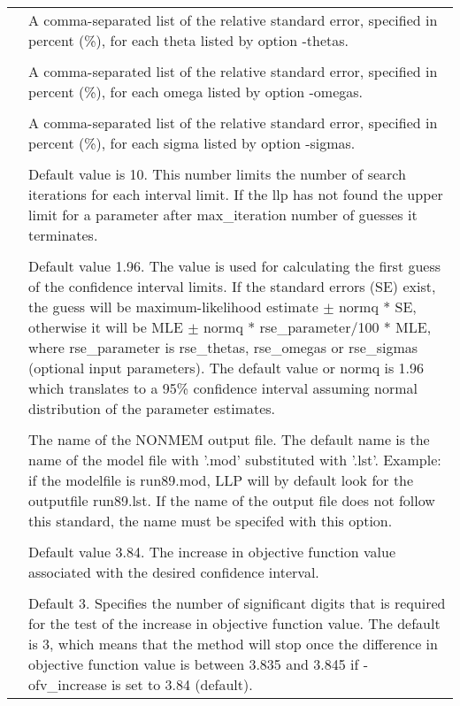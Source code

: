 \documentclass[a4paper,12pt]{article}
\begin{document}
\begin{longtable}{p{1in}p{4in}}
\verb%-rse_thetas=<list>% & \\
 & A comma-separated list of the relative standard error, specified in percent (\%), for each theta listed by option -thetas. \\
\\
\verb%-rse_omegas=<list>% & \\
 & A comma-separated list of the relative standard error, specified in percent (\%), for each omega listed by option -omegas. \\
\\
\verb%-rse_sigmas=<list>% & \\
 & A comma-separated list of the relative standard error, specified in percent (\%), for each sigma listed by option -sigmas. \\
\\
\verb%-max_iterations=N% & \\
 & Default value is 10. This number limits the number of search iterations for each interval limit. If the llp has not found the upper limit for a parameter after max\_iteration number of guesses it terminates. \\
\\
\verb%-normq=X% & \\
\nopagebreak
 & Default value 1.96. The value is used for calculating the first guess of the confidence interval limits. If the standard errors (SE) exist, the guess will be maximum-likelihood estimate $\pm$ normq * SE, otherwise it will be MLE $\pm$ normq * rse\_parameter/100 * MLE, where rse\_parameter is rse\_thetas, rse\_omegas or rse\_sigmas (optional input parameters). The default value or normq is 1.96 which translates to a 95\% confidence interval assuming normal distribution of the parameter estimates. \\
\\
\verb%-outputfile=<filename>% & \\
 & The name of the NONMEM output file. The default name is the name of the model file with '.mod' substituted with '.lst'. Example: if the modelfile is run89.mod, LLP will by default look for the outputfile run89.lst. If the name of the output file does not follow this standard, the name must be specifed with this option. \\
\\
\verb%-ofv_increase=X% & \\
 & Default value 3.84. The increase in objective function value associated with the desired confidence interval. \\
\\
\verb%-significant_digits=N% & \\
 & Default 3. Specifies the number of significant digits that is required for the test of the increase in objective function value. The default is 3, which means that the method will stop once the difference in objective function value is between 3.835 and 3.845 if -ofv\_increase is set to 3.84 (default). \\
\end{longtable}
\end{document}
